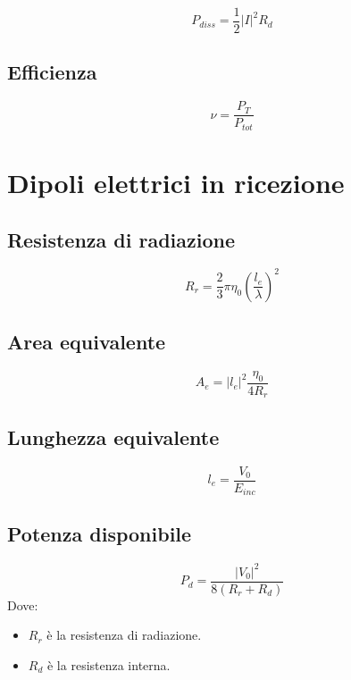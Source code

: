 \documentclass[10pt,a4paper]{report}
\begin{document}
	  \[
	  P_{diss}=\frac{1}{2}|I|^2R_d
	  \]

	  \subsection{Efficienza}

	  	\[
		\nu=\frac{P_{T}}{P_{tot}}
	  	\]


		\section{Dipoli elettrici in ricezione}

			\subsection{Resistenza di radiazione}			
				\begin{equation}
				R_r=\frac{2}{3}\pi\eta_0(\frac{l_e}{\lambda})^2
				\end{equation}

			\subsection{Area equivalente}			
				\begin{equation}
				A_e=|l_e|^2\frac{\eta_0}{4R_r}
				\end{equation}

			\subsection{Lunghezza equivalente}			
				\begin{equation}
				l_e=\frac{V_0}{E_{inc}}
				\label{eq:lunghezza-equivalente}
				\end{equation}

			\subsection{Potenza disponibile}			
				\begin{equation}
			P_d=\frac{|V_0|^2}{8(R_r+R_d)}
				\end{equation}
			Dove:

			\begin{itemize}
			\item $R_r$ è la resistenza di radiazione.
			\item $R_d$ è la resistenza interna.
			\end{itemize}
			
\end{document}
